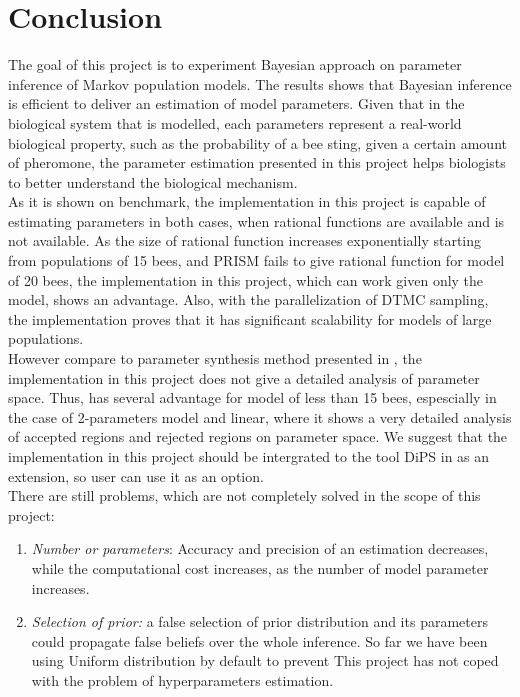 \documentclass[12pt]{article}
\theoremstyle{definition}
\begin{document}
\section{Conclusion}
The goal of this project is to experiment Bayesian approach on parameter
inference of Markov population models. The results shows that Bayesian inference
is efficient to deliver an estimation of model parameters. Given that in the
biological system that is modelled, each parameters represent a real-world
biological property, such as the probability of a bee sting, given a certain
amount of pheromone, the parameter estimation presented in this project helps
biologists to better understand the biological mechanism.\\
As it is shown on benchmark, the implementation in this project is capable of
estimating parameters in both cases, when rational functions are available and is
not available. As the size of rational function increases exponentially starting
from populations of 15 bees, and PRISM fails to give rational function for model
of 20 bees, the implementation in this project, which can work given only the
model, shows an advantage. Also, with the parallelization of DTMC sampling, the
implementation proves that it has significant scalability for models of large
populations.\\
However compare to parameter synthesis method presented in \cite{hajnal2019data}, the
implementation in this project does not give a detailed analysis of parameter
space. Thus, \cite{hajnal2019data} has several advantage for model of less than
15 bees, espescially in the case of 2-parameters model and linear, where it shows a very
detailed analysis of accepted regions and rejected regions on parameter space.
We suggest that the implementation in this project should be intergrated to the
tool DiPS in \cite{hajnal2019data} as an extension, so user can use it as an option.\\
There are still problems, which are not completely solved in the scope of this project:
\begin{enumerate}
\item \textit{Number or parameters}: Accuracy and precision of an estimation
  decreases, while the computational cost increases, as the number of model
  parameter increases.
\item \textit{Selection of prior:} a false selection of prior distribution and
  its parameters could propagate false beliefs over the whole inference. So far
  we have been using Uniform distribution by default to prevent 
  This project has not coped with the problem of hyperparameters
  estimation.
\end{enumerate}





\newpage
\printbibliography
\end{document}
